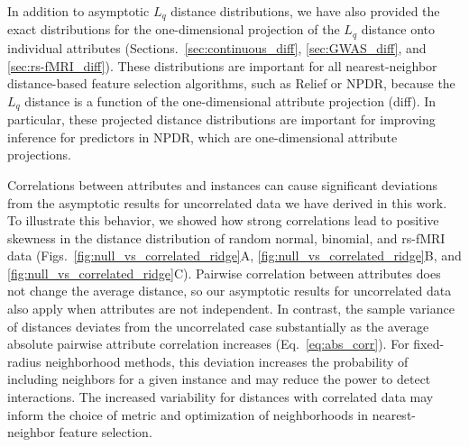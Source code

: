 \documentclass[aos]{imsart}
\begin{document}
In addition to asymptotic $L_q$ distance distributions, we have also provided the exact distributions for the one-dimensional projection of the $L_q$ distance onto individual attributes (Sections.~\ref{sec:continuous_diff}, \ref{sec:GWAS_diff}, and \ref{sec:rs-fMRI_diff}). These distributions are important for all nearest-neighbor distance-based feature selection algorithms, such as Relief or NPDR, because the $L_q$ distance is a function of the one-dimensional attribute projection (diff). In particular, these projected distance distributions are important for improving inference for predictors in NPDR, which are one-dimensional attribute projections.

Correlations between attributes and instances can cause significant deviations from the asymptotic results for uncorrelated data we have derived in this work. To illustrate this behavior, we showed how strong correlations lead to positive skewness in the distance distribution of random normal, binomial, and rs-fMRI data (Figs.~\ref{fig:null_vs_correlated_ridge}A, \ref{fig:null_vs_correlated_ridge}B, and \ref{fig:null_vs_correlated_ridge}C). Pairwise correlation between attributes does not change the average distance, so our asymptotic results for uncorrelated data also apply when attributes are not independent. In contrast, the sample variance of distances deviates from the uncorrelated case substantially as the average absolute pairwise attribute correlation increases (Eq.~\ref{eq:abs_corr}). For fixed-radius neighborhood methods, this deviation increases the probability of including neighbors for a given instance and may reduce the power to detect interactions. The increased variability for distances with correlated data may inform the choice of metric and optimization of neighborhoods in nearest-neighbor feature selection. 


\end{document}
